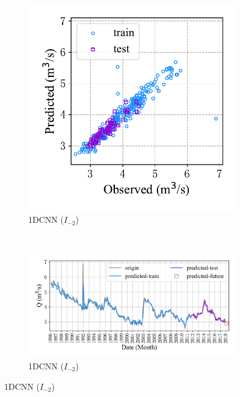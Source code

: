 \begin{figure}[!htbp]
\begin{subfigure}[b]{0.615\textwidth}
  \end{subfigure}
  \\
  \begin{subfigure}[b]{0.305\textwidth}
    \includegraphics[width=\textwidth]{Img/chap4_spr/out1/spr_scatter_in_2_out_1_cnn.pdf}
    \vspace{-1.2cm}
    \caption{1DCNN ($I_{-2}$)}
    \label{fig:spr_scatter_in_2_out_1_cnn}
  \end{subfigure}
  ~
  \begin{subfigure}[b]{0.615\textwidth}
    \includegraphics[width=\textwidth]{Img/chap4_spr/out1/spr_series_in_2_out_1_cnn.pdf}
    \vspace{-1.2cm}
    \caption{1DCNN ($I_{-2}$)}
    \label{fig:spr_series_in_2_out_1_cnn}

\end{subfigure}
\end{figure}
